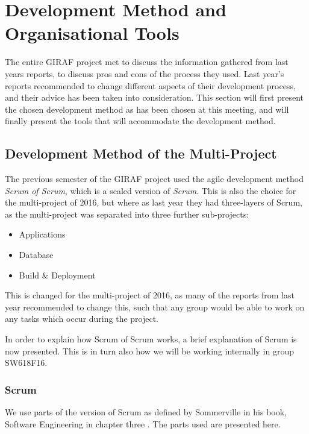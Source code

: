\section{Development Method and Organisational Tools}
The entire GIRAF project met to discuss the information gathered from last years reports, to discuss pros and cons of the process they used.
Last year's reports recommended to change different aspects of their development process, and their advice has been taken into consideration.
This section will first present the chosen development method as has been chosen at this meeting, and will finally present the tools that will accommodate the development method.


\subsection*{Development Method of the Multi-Project}
The previous semester of the GIRAF project used the agile development method \textit{Scrum of Scrum}, which is a scaled version of \textit{Scrum}.
This is also the choice for the multi-project of 2016, but where as last year they had three-layers of Scrum, as the multi-project was separated into three further sub-projects:
\begin{itemize}
	\item Applications
	\item Database
	\item Build \& Deployment
\end{itemize}

This is changed for the multi-project of 2016, as many of the reports from last year recommended to change this, such that any group would be able to work on any tasks which occur during the project. 

In order to explain how Scrum of Scrum works, a brief explanation of Scrum is now presented.
This is in turn also how we will be working internally in group SW618F16. 


\subsubsection*{Scrum}

We use parts of the version of Scrum as defined by Sommerville in his book, Software Engineering in chapter three \cite{SEBOOK}.
The parts used are presented here.

